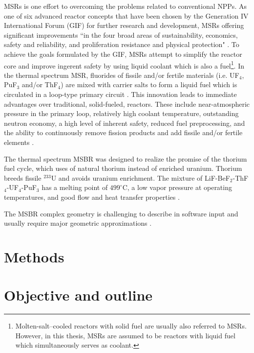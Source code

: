 \glspl{MSR} is one effort to overcoming the problems related to conventional \glspl{NPP}. As one of six advanced reactor concepts that have been chosen by the Generation IV International Forum (GIF) for further research and development, \glspl{MSR}  offering significant improvements ``in the four broad areas of sustainability, economics, safety and reliability, and proliferation resistance and physical protection" \cite{doe_technology_2002}. To achieve the goals formulated by the GIF, \glspl{MSR} attempt to simplify the reactor core and improve ingerent safety by using liquid coolant which is also a fuel\footnote{Molten-salt–cooled reactors with solid fuel are usually also referred to \glspl{MSR}. However, in this thesis, \glspl{MSR} are assumed to be reactors with liquid fuel which simultaneously serves as coolant.}. In the thermal spectrum \gls{MSR}, fluorides of fissile and/or fertile materials (i.e. UF$_4$, PuF$_3$ and/or ThF$_4$) are mixed with carrier salts to form a liquid fuel which is circulated in a loop-type primary circuit \cite{haubenreich_experience_1970}. This innovation leads to immediate advantages over traditional, solid-fueled, reactors. These include near-atmospheric pressure in the primary loop, relatively high coolant temperature, outstanding neutron economy, a high level of inherent safety, reduced fuel preprocessing, and the ability to continuously remove fission products and add fissile and/or fertile elements \cite{leblanc_molten_2010}. 

The thermal spectrum \gls{MSBR} was designed to realize the promise of the thorium fuel cycle, which uses of natural thorium instead of enriched uranium. Thorium breeds fissile $^{233}$U and avoids uranium enrichment. The mixture of LiF-BeF$_2$-ThF$_4$-UF$_4$-PuF$_3$ has a melting point of $499^\circ$C, a low vapor pressure at operating temperatures, and good flow and heat transfer properties \cite{robertson_conceptual_1971}. 

The \gls{MSBR} complex geometry is challenging to describe in software input and usually require major geometric 
approximations \cite{park_whole_2015}. 

\section{Methods}

\section{Objective and outline}

